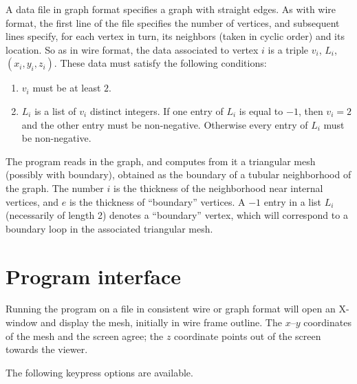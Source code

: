 \documentclass[12pt]{article}
\begin{document}
A data file in graph format specifies a graph with straight edges. As with wire format,
the first line of the file specifies the number of vertices, and subsequent lines specify,
for each vertex in turn, its neighbors (taken in cyclic order) and its location. 
So as in wire format, the data associated to vertex $i$ is a triple $v_i$, $L_i$, $(x_i,y_i,z_i)$.
These data must satisfy the following conditions:
\begin{enumerate}
\item{$v_i$ must be at least $2$.}
\item{$L_i$ is a list of $v_i$ distinct integers. If one entry of $L_i$ is equal to $-1$, then
$v_i=2$ and the other entry must be non-negative. Otherwise every entry of $L_i$ must be
non-negative.}
\end{enumerate}

The program reads in the graph, and computes from it a triangular mesh (possibly with
boundary), obtained as the boundary of a tubular neighborhood of the graph. The
number $i$ is the thickness of the neighborhood near internal vertices, and $e$ is
the thickness of ``boundary'' vertices. A $-1$
entry in a list $L_i$ (necessarily of length 2) denotes a ``boundary'' vertex, which
will correspond to a boundary loop in the associated triangular mesh.

\section{Program interface}\label{section:interface}

Running the program on a file in consistent wire or graph format will open an X-window
and display the mesh, initially in wire frame outline. The $x$--$y$ coordinates of the
mesh and the screen agree; the $z$ coordinate points out of the screen towards the viewer.

The following keypress options are available.
\end{document}
